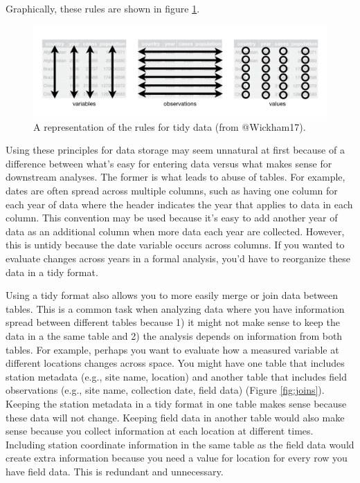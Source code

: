 \documentclass[
]{book}
\begin{document}
Graphically, these rules are shown in figure \ref{fig:tidy}.

\begin{figure}

{\centering \includegraphics[width=1\linewidth]{img/tidy-1} 

}

\caption{A representation of the rules for tidy data (from @Wickham17).}\label{fig:tidy}
\end{figure}

Using these principles for data storage may seem unnatural at first because of a difference between what's easy for entering data versus what makes sense for downstream analyses. The former is what leads to abuse of tables. For example, dates are often spread across multiple columns, such as having one column for each year of data where the header indicates the year that applies to data in each column. This convention may be used because it's easy to add another year of data as an additional column when more data each year are collected. However, this is untidy because the date variable occurs across columns. If you wanted to evaluate changes across years in a formal analysis, you'd have to reorganize these data in a tidy format.

Using a tidy format also allows you to more easily merge or join data between tables. This is a common task when analyzing data where you have information spread between different tables because 1) it might not make sense to keep the data in a the same table and 2) the analysis depends on information from both tables. For example, perhaps you want to evaluate how a measured variable at different locations changes across space. You might have one table that includes station metadata (e.g., site name, location) and another table that includes field observations (e.g., site name, collection date, field data) (Figure \ref{fig:joins}). Keeping the station metadata in a tidy format in one table makes sense because these data will not change. Keeping field data in another table would also make sense because you collect information at each location at different times. Including station coordinate information in the same table as the field data would create extra information because you need a value for location for every row you have field data. This is redundant and unnecessary.
\end{document}
